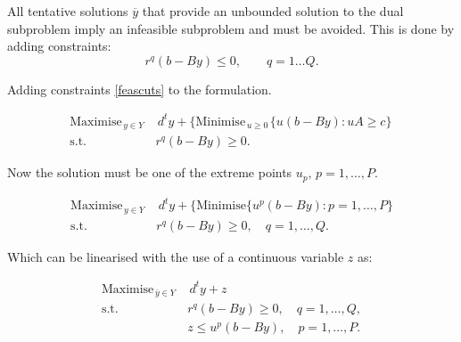 All tentative solutions $\overline{y}$ that provide an unbounded  solution to the dual subproblem  imply an infeasible  subproblem and must be avoided.  This is done by  adding  constraints:
\begin{equation}
\label{feascuts}
r^q(b-By) \leq 0, \qquad q=1 \dots Q.
\end{equation}




Adding  constraints \eqref{feascuts} to the  formulation.
\vspace{-0.5cm}

\begin{align*}
\textrm{Maximise}_{\, y \in Y \,}  & \, d^ty + \{ \textrm{Minimise}_{\, u\geq 0 \,} \{ u(b-By)
: uA \geq c\}\, \\
\textrm{s.t.} \quad & r^q(b-By) \geq 0.
\end{align*}

Now the solution must be one of the extreme points $u_p, \, p=1,\hdots,P. $
\vspace{-0.5cm}

\begin{align*}
\textrm{Maximise}_{\, y \in Y \,}  & \,  d^ty + \{ \textrm{Minimise}\{u^p(b-By): p=1,\hdots,P \} \\
\textrm{s.t.} \quad & r^q(b-By) \geq 0, \quad  q=1,\hdots,Q.
\end{align*}

Which can be linearised with the use of a continuous variable $z$ as:
\vspace{-0.5cm}

\begin{align*}
\textrm{Maximise}_{\, \overline{y} \in Y \,}  & \,  d^ty + z \\
\textrm{s.t.} \quad & r^q(b-By) \geq 0, \quad  q=1,\hdots,Q,\\
& z \leq u^p(b-By), \quad  p=1,\hdots,P.
\end{align*}



